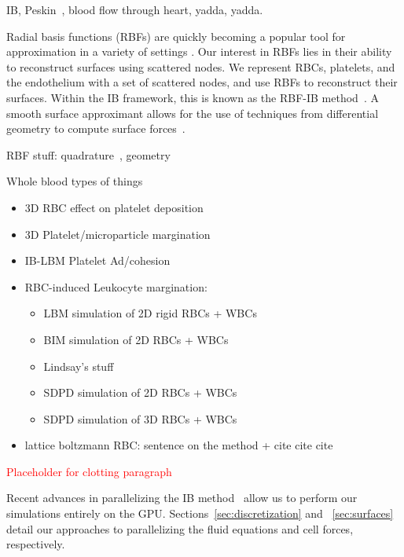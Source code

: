IB, Peskin~\cite{Peskin:1972wa,Peskin:1977wza,Peskin:2002go}, blood flow through heart, yadda, yadda.

Radial basis functions (RBFs) are quickly becoming a popular tool for approximation in
a variety of settings {\XXX}. Our interest in RBFs lies in their ability to reconstruct
surfaces using scattered nodes. We represent RBCs, platelets, and the endothelium with a
set of scattered nodes, and use RBFs to reconstruct their surfaces. Within the IB
framework, this is known as the RBF-IB method~\cite{Shankar:2015km}. A smooth surface
approximant allows for the use of techniques from differential geometry to compute
surface forces~\cite{Maxian:2018ek}.


\noindent RBF stuff: quadrature~\cite{Fuselier:2013coba,Maxian:2018ek}, geometry~\cite{Shankar:2013ki,Olson:2015ja}

\noindent Whole blood types of things
\begin{itemize}[noitemsep, topsep=0pt]
    \item 3D RBC effect on platelet deposition~\cite{Wang:2013gs}
    \item 3D Platelet/microparticle margination~\cite{Vahidkhah:2014hy,Vahidkhah:2015ch}
    \item IB-LBM Platelet Ad/cohesion~\cite{Wu:2014gt}
    \item RBC-induced Leukocyte margination:
        \begin{itemize}[noitemsep, topsep=0pt]
            \item LBM simulation of 2D rigid RBCs + WBCs~\cite{Sun:2003cr}
            \item BIM simulation of 2D RBCs + WBCs~\cite{Freund:2007kx}
            \item Lindsay's stuff~\cite{Erickson:2010ep,Erickson:2011cf,Skorczewski:2013jn}
            \item SDPD simulation of 2D RBCs + WBCs~\cite{Fedosov:2012dy}
            \item SDPD simulation of 3D RBCs + WBCs~\cite{Fedosov:2014bs}
        \end{itemize}
    \item lattice boltzmann RBC: sentence on the method + cite cite cite
\end{itemize}


\noindent \textcolor{red}{Placeholder for clotting paragraph}

Recent advances in parallelizing the IB method~\cite{Kassen:2020hj} allow us to
perform our simulations entirely on the GPU. Sections~\ref{sec:discretization} and~
\ref{sec:surfaces} detail our approaches to parallelizing the fluid equations and cell
forces, respectively.

